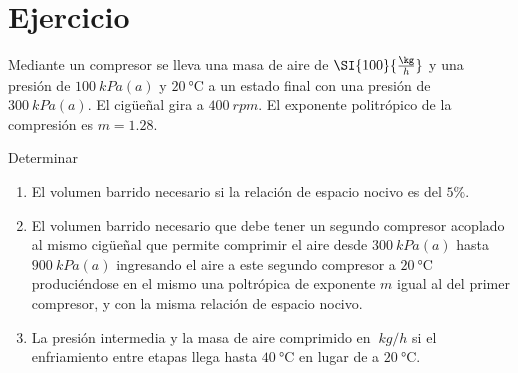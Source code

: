 \section{Ejercicio}\label{ej:Chap06Ejercicio02}

Mediante un compresor se lleva una masa de aire de $\SI{100}{\frac{\kg}{h}}$  y una presión de $\SI{100}{kPa(a)}$ y $\SI{20}{\celsius}$ a un estado final con una presión de $\SI{300}{kPa(a)}$. El cigüeñal gira a $\SI{400}{rpm}$. El exponente politrópico de la compresión es $m=1.28$.

Determinar
\begin{enumerate}
    \item El volumen barrido necesario si la relación de espacio nocivo es del $5\%$.
    \item El volumen barrido necesario que debe tener un segundo compresor acoplado al mismo cigüeñal que permite comprimir el aire desde $\SI{300}{kPa(a)}$ hasta $\SI{900}{kPa(a)}$ ingresando el aire a este segundo compresor a $\SI{20}{\celsius}$ produciéndose en el mismo una poltrópica de exponente $m$ igual al del primer compresor, y con la misma relación de espacio nocivo.
    \item La presión intermedia y la masa de aire comprimido en $\SI{}{kg/h}$ si el enfriamiento entre etapas llega hasta $\SI{40}{\celsius}$ en lugar de a $\SI{20}{\celsius}$.
\end{enumerate}